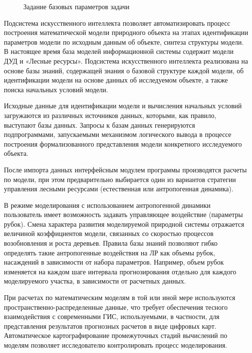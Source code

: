 \begin{figure}
\caption{Задание базовых параметров задачи}\label{pic:basic_task_params}
\end{figure}

Подсистема искусственного интеллекта позволяет автоматизировать процесс построения математической модели природного объекта на этапах идентификации параметров модели по исходным данным об объекте, синтеза структуры модели. В настоящее время база моделей информационной системы содержит модели ДУД и «Лесные ресурсы». Подсистема искусственного интеллекта реализована на основе базы знаний, содержащей знания о базовой структуре каждой модели, об идентификации модели на основе данных об исследуемом объекте, а также поиска начальных условий модели.

Исходные данные для идентификации модели и вычисления начальных условий загружаются из различных источников данных, которыми, как правило, выступают базы данных. Запросы к базам данных генерируются подпрограммами, запускаемыми механизмом логического вывода в процессе построения формализованного представления модели конкретного исследуемого объекта.

После импорта данных интерфейсным модулем программы производятся расчеты по модели, при этом предварительно выбирается один из вариантов стратегии управления лесными ресурсами (естественная или антропогенная динамика).

В режиме моделирования с использованием антропогенной динамики пользователь имеет возможность задавать управляющее воздействие (параметры рубок). Смена характера развития моделируемой природной системы отражается величиной коэффициентов модели, связанных со скоростью процессов возобновления и роста деревьев. Правила базы знаний позволяют гибко определять такие антропогенные воздействия на ЛР как объемы рубок, насаждений в зависимости от набора параметров. Например, объем рубок изменяется на каждом шаге интервала прогнозирования отдельно для каждого моделируемого участка, в зависимости от расчетных данных.

При расчетах по математическим моделям в той или иной мере используются пространственно-распределенные данные, что требует обеспечения тесного взаимодействия с современными ГИС, используемыми, в частности, для представления результатов прогнозных расчетов в виде цифровых карт. Автоматическое картографирование промежуточных стадий вычислений по моделям позволяет исследователю контролировать процесс моделирования.

